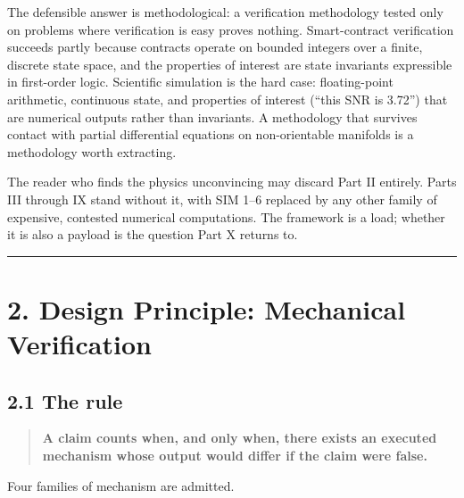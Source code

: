 \documentclass[
  11pt]{report}
\begin{document}
The defensible answer is methodological: a verification methodology
tested only on problems where verification is easy proves nothing.
Smart-contract verification succeeds partly because contracts operate on
bounded integers over a finite, discrete state space, and the properties
of interest are state invariants expressible in first-order logic.
Scientific simulation is the hard case: floating-point arithmetic,
continuous state, and properties of interest (``this SNR is 3.72'') that
are numerical outputs rather than invariants. A methodology that
survives contact with partial differential equations on non-orientable
manifolds is a methodology worth extracting.

The reader who finds the physics unconvincing may discard Part II
entirely. Parts III through IX stand without it, with SIM 1--6 replaced
by any other family of expensive, contested numerical computations. The
framework is a load; whether it is also a payload is the question Part X
returns to.

\begin{center}\rule{0.5\linewidth}{0.5pt}\end{center}

\hypertarget{design-principle-mechanical-verification}{%
\chapter{2. Design Principle: Mechanical
Verification}\label{design-principle-mechanical-verification}}

\hypertarget{the-rule}{%
\section{2.1 The rule}\label{the-rule}}

\begin{quote}
\textbf{A claim counts when, and only when, there exists an executed
mechanism whose output would differ if the claim were false.}
\end{quote}

Four families of mechanism are admitted.
\end{document}
